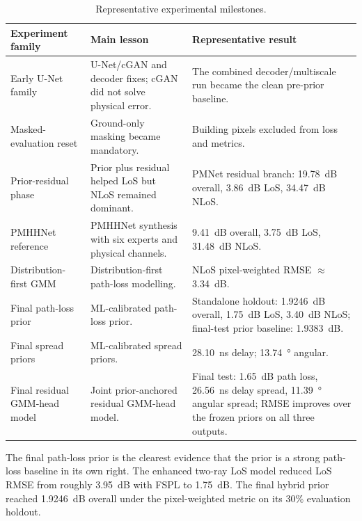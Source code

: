 \begin{table}[H]
\centering
\caption{Representative experimental milestones.}
\label{tab:timeline_results}
\begingroup
\footnotesize
\renewcommand{\arraystretch}{1.05}
\setlength{\tabcolsep}{3pt}
\begin{tabularx}{\textwidth}{>{\raggedright\arraybackslash}p{2.65cm}>{\raggedright\arraybackslash}X>{\raggedright\arraybackslash}X}
\toprule
Experiment family & Main lesson & Representative result \\
\midrule
Early U-Net family   & U-Net/cGAN and decoder fixes; cGAN did not solve physical error. & The combined decoder/multiscale run became the clean pre-prior baseline. \\
Masked-evaluation reset  & Ground-only masking became mandatory. & Building pixels excluded from loss and metrics. \\
Prior-residual phase  & Prior plus residual helped LoS but NLoS remained dominant. & PMNet residual branch: \SI{19.78}{dB} overall, \SI{3.86}{dB} LoS, \SI{34.47}{dB} NLoS. \\
PMHHNet reference      & PMHHNet synthesis with six experts and physical channels. & \SI{9.41}{dB} overall, \SI{3.75}{dB} LoS, \SI{31.48}{dB} NLoS. \\
Distribution-first GMM      & Distribution-first path-loss modelling. & NLoS pixel-weighted RMSE $\approx$\,\SI{3.34}{dB}. \\
Final path-loss prior      & ML-calibrated path-loss prior. & Standalone holdout: \SI{1.9246}{dB} overall, \SI{1.75}{dB} LoS, \SI{3.40}{dB} NLoS; final-test prior baseline: \SI{1.9383}{dB}. \\
Final spread priors      & ML-calibrated spread priors. & \SI{28.10}{ns} delay; \SI{13.74}{\degree} angular. \\
Final residual GMM-head model      & Joint prior-anchored residual GMM-head model. & Final test: \SI{1.65}{dB} path loss, \SI{26.56}{ns} delay spread, \SI{11.39}{\degree} angular spread; RMSE improves over the frozen priors on all three outputs. \\
\bottomrule
\end{tabularx}
\endgroup
\end{table}

The final path-loss prior is the clearest evidence that the prior is a strong
path-loss baseline in its own right. The enhanced two-ray LoS model
reduced LoS RMSE from roughly \SI{3.95}{dB} with FSPL to
\SI{1.75}{dB}. The final hybrid prior reached \SI{1.9246}{dB} overall under the
pixel-weighted metric on its 30\% evaluation holdout.

